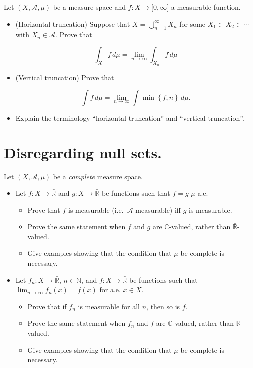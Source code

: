 \documentclass{qlnotes-export}
\begin{document}
Let \((X,\mathcal{A},\mu)\) be a measure space and \(f:X\rightarrow\lbrack 0,\infty\rbrack\) a measurable function.

\begin{itemize}
\item
  (Horizontal truncation) Suppose that \(X = \bigcup_{n = 1}^{\infty}X_{n}\) for some \(X_{1} \subset X_{2} \subset \cdots\) with \(X_{n} \in \mathcal{A}\). Prove that

  \[\int_{X}f\, d\mu = \lim\limits_{n\rightarrow\infty}\int_{X_{n}}f\, d\mu\]
\item
  (Vertical truncation) Prove that

  \[\int f\, d\mu = \lim\limits_{n\rightarrow\infty}\int\min\left\{ {f,n} \right\}\, d\mu.\]
\item
  Explain the terminology ``horizontal truncation'' and ``vertical truncation''.
\end{itemize}

\section{Disregarding null sets.}

Let \((X,\mathcal{A},\mu)\) be a \emph{complete} measure space.

\begin{itemize}
\item
  Let \(f:X\rightarrow\bar{\mathbb{R}}\) and \(g:X\rightarrow\bar{\mathbb{R}}\) be functions such that \(f = g\) \(\mu\)-a.e.

  \begin{itemize}
  \item
    Prove that \(f\) is measurable (i.e.~\(\mathcal{A}\)-measurable) iff \(g\) is measurable.
  \item
    Prove the same statement when \(f\) and \(g\) are \(\mathbb{C}\)-valued, rather than \(\bar{\mathbb{R}}\)-valued.
  \item
    Give examples showing that the condition that \(\mu\) be complete is necessary.
  \end{itemize}
\item
  Let \(f_{n}:X\rightarrow\bar{\mathbb{R}}\), \(n \in {\mathbb{N}}\), and \(f:X\rightarrow\bar{\mathbb{R}}\) be functions such that \(\lim_{n\rightarrow\infty}f_{n}(x) = f(x)\) for a.e. \(x \in X\).

  \begin{itemize}
  \item
    Prove that if \(f_{n}\) is measurable for all \(n\), then so is \(f\).
  \item
    Prove the same statement when \(f_{n}\) and \(f\) are \(\mathbb{C}\)-valued, rather than \(\bar{\mathbb{R}}\)-valued.
  \item
    Give examples showing that the condition that \(\mu\) be complete is necessary.
  \end{itemize}
\end{itemize}
\end{document}
